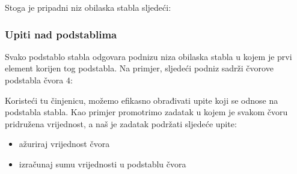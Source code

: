 Stoga je pripadni niz obilaska stabla sljedeći:
\begin{center}
\end{center}

\subsubsection{Upiti nad podstablima}

Svako podstablo stabla odgovara podnizu
niza obilaska stabla u kojem je
prvi element korijen tog podstabla.
Na primjer, sljedeći podniz sadrži
čvorove podstabla čvora $4$:
\begin{center}
\end{center}
Koristeći tu činjenicu, možemo efikasno obrađivati upite
koji se odnose na podstabla stabla.
Kao primjer promotrimo zadatak u kojem je svakom čvoru
pridružena vrijednost, a naš je zadatak podržati
sljedeće upite:
\begin{itemize}
\item ažuriraj vrijednost čvora
\item izračunaj sumu vrijednosti u podstablu čvora
\end{itemize}

